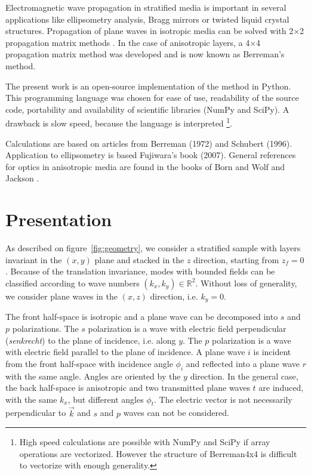 

Electromagnetic wave propagation in stratified media is important in several applications like ellipsometry analysis, Bragg mirrors or twisted liquid crystal structures.
Propagation of plane waves in isotropic media can be solved with 2$\times$2 propagation matrix methods \cite{BornWolf}.
In the case of anisotropic layers, a 4$\times$4 propagation matrix method was developed \cite{1970_TeilerHenvis, Berreman} and is now known as Berreman's method. 

The present work is an open-source implementation of the method in Python.
This programming language was chosen for ease of use, readability of the source code, portability and availability of scientific libraries (NumPy and SciPy).
A drawback is slow speed, because the language is interpreted%
\footnote{%
High speed calculations are possible with NumPy and SciPy if array operations are vectorized.
However the structure of Berreman4x4 is difficult to vectorize with enough generality.}.

Calculations are based on articles from Berreman \cite{Berreman} (1972) and Schubert \cite{Schubert} (1996).
Application to ellipsometry is based Fujiwara's book \cite{Fujiwara} (2007).
General references for optics in anisotropic media are found in the books of Born and Wolf \cite{BornWolf} and Jackson \cite{Jackson}.

\section{Presentation}

As described on figure~\ref{fig:geometry}, we consider a stratified sample with layers invariant in the $(x,y)$ plane and stacked in the $z$ direction, starting from $z_f=0$.
Because of the translation invariance, modes with bounded fields can be classified according to wave numbers $(k_x,k_y)\in\mathbb{R}^2$.
Without loss of generality, we consider plane waves in the $(x,z)$ direction, i.e. $k_y=0$.

The front half-space is isotropic and a plane wave can be decomposed into $s$ and $p$ polarizations.
The $s$ polarization is a wave with electric field perpendicular (\emph{senkrecht}) to the plane of incidence, i.e. along $y$.
The $p$ polarization is a wave with electric field parallel to the plane of incidence.
A plane wave $i$ is incident from the front half-space with incidence angle $\phi_i$ and reflected into a plane wave $r$ with the same angle.
Angles are oriented by the $y$ direction.
In the general case, the back half-space is anisotropic and two transmitted plane waves $t$ are induced, with the same $k_x$, but different angles $\phi_t$.
The electric vector is not necessarily perpendicular to $\vec k$ and $s$ and $p$ waves can not be considered.

